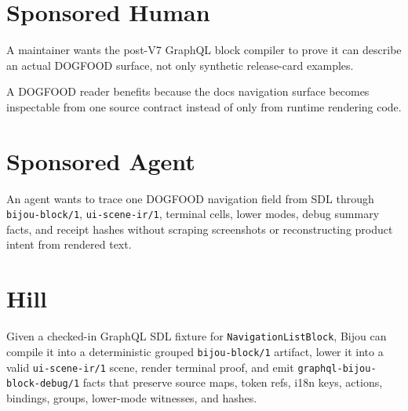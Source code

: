 

\section{Sponsored Human}\label{record-142-sponsored-human}

A maintainer wants the post-V7 GraphQL block compiler to prove it can describe an actual DOGFOOD surface, not only synthetic release-card examples.

A DOGFOOD reader benefits because the docs navigation surface becomes inspectable from one source contract instead of only from runtime rendering code.

\section{Sponsored Agent}\label{record-142-sponsored-agent}

An agent wants to trace one DOGFOOD navigation field from SDL through \texttt{b\allowbreak{}i\allowbreak{}j\allowbreak{}o\allowbreak{}u\allowbreak{}-\allowbreak{}b\allowbreak{}l\allowbreak{}o\allowbreak{}c\allowbreak{}k\allowbreak{}/\allowbreak{}1}, \texttt{u\allowbreak{}i\allowbreak{}-\allowbreak{}s\allowbreak{}c\allowbreak{}e\allowbreak{}n\allowbreak{}e\allowbreak{}-\allowbreak{}i\allowbreak{}r\allowbreak{}/\allowbreak{}1}, terminal cells, lower modes, debug summary facts, and receipt hashes without scraping screenshots or reconstructing product intent from rendered text.

\section{Hill}\label{record-142-hill}

Given a checked-in GraphQL SDL fixture for \texttt{N\allowbreak{}a\allowbreak{}v\allowbreak{}i\allowbreak{}g\allowbreak{}a\allowbreak{}t\allowbreak{}i\allowbreak{}o\allowbreak{}n\allowbreak{}L\allowbreak{}i\allowbreak{}s\allowbreak{}t\allowbreak{}B\allowbreak{}l\allowbreak{}o\allowbreak{}c\allowbreak{}k}, Bijou can compile it into a deterministic grouped \texttt{b\allowbreak{}i\allowbreak{}j\allowbreak{}o\allowbreak{}u\allowbreak{}-\allowbreak{}b\allowbreak{}l\allowbreak{}o\allowbreak{}c\allowbreak{}k\allowbreak{}/\allowbreak{}1} artifact, lower it into a valid \texttt{u\allowbreak{}i\allowbreak{}-\allowbreak{}s\allowbreak{}c\allowbreak{}e\allowbreak{}n\allowbreak{}e\allowbreak{}-\allowbreak{}i\allowbreak{}r\allowbreak{}/\allowbreak{}1} scene, render terminal proof, and emit \texttt{g\allowbreak{}r\allowbreak{}a\allowbreak{}p\allowbreak{}h\allowbreak{}q\allowbreak{}l\allowbreak{}-\allowbreak{}b\allowbreak{}i\allowbreak{}j\allowbreak{}o\allowbreak{}u\allowbreak{}-\allowbreak{}b\allowbreak{}l\allowbreak{}o\allowbreak{}c\allowbreak{}k\allowbreak{}-\allowbreak{}d\allowbreak{}e\allowbreak{}b\allowbreak{}u\allowbreak{}g\allowbreak{}/\allowbreak{}1} facts that preserve source maps, token refs, i18n keys, actions, bindings, groups, lower-mode witnesses, and hashes.

